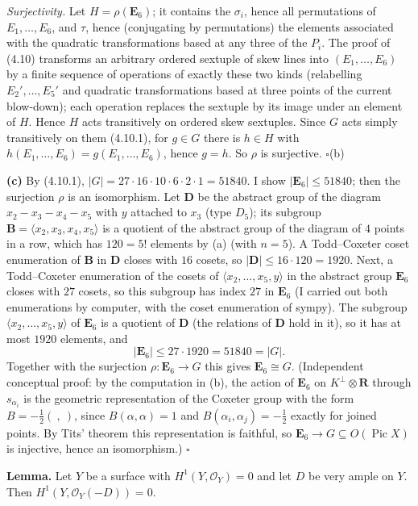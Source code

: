\documentclass[11pt]{article}
\begin{document}
\emph{Surjectivity.} Let $H=\rho(\mathbf E_6)$; it contains the $\sigma_i$, hence all permutations of $E_1,\dots,E_6$, and $\tau$, hence (conjugating by permutations) the elements associated with the quadratic transformations based at any three of the $P_i$. The proof of (4.10) transforms an arbitrary ordered sextuple of skew lines into $(E_1,\dots,E_6)$ by a finite sequence of operations of exactly these two kinds (relabelling $E_2',\dots,E_5'$ and quadratic transformations based at three points of the current blow-down); each operation replaces the sextuple by its image under an element of $H$. Hence $H$ acts transitively on ordered skew sextuples. Since $G$ acts simply transitively on them (4.10.1), for $g\in G$ there is $h\in H$ with $h(E_1,\dots,E_6)=g(E_1,\dots,E_6)$, hence $g=h$. So $\rho$ is surjective. \hfill$\square$(b)

\textbf{(c)} By (4.10.1), $|G|=27\cdot16\cdot10\cdot6\cdot2\cdot1=51840$. I show $|\mathbf E_6|\le51840$; then the surjection $\rho$ is an isomorphism. Let $\mathbf D$ be the abstract group of the diagram $x_2-x_3-x_4-x_5$ with $y$ attached to $x_3$ (type $D_5$); its subgroup $\mathbf B=\langle x_2,x_3,x_4,x_5\rangle$ is a quotient of the abstract group of the diagram of $4$ points in a row, which has $120=5!$ elements by (a) (with $n=5$). A Todd--Coxeter coset enumeration of $\mathbf B$ in $\mathbf D$ closes with $16$ cosets, so $|\mathbf D|\le16\cdot120=1920$. Next, a Todd--Coxeter enumeration of the cosets of $\langle x_2,\dots,x_5,y\rangle$ in the abstract group $\mathbf E_6$ closes with $27$ cosets, so this subgroup has index $27$ in $\mathbf E_6$ (I carried out both enumerations by computer, with the coset enumeration of sympy). The subgroup $\langle x_2,\dots,x_5,y\rangle$ of $\mathbf E_6$ is a quotient of $\mathbf D$ (the relations of $\mathbf D$ hold in it), so it has at most $1920$ elements, and
\[
|\mathbf E_6|\le27\cdot1920=51840=|G| .
\]
Together with the surjection $\rho:\mathbf E_6\to G$ this gives $\mathbf E_6\cong G$. (Independent conceptual proof: by the computation in (b), the action of $\mathbf E_6$ on $K^\perp\otimes\mathbf R$ through $s_{\alpha_i}$ is the geometric representation of the Coxeter group with the form $B=-\frac12(\ ,\ )$, since $B(\alpha,\alpha)=1$ and $B(\alpha_i,\alpha_j)=-\frac12$ exactly for joined points. By Tits' theorem this representation is faithful, so $\mathbf E_6\to G\subseteq O(\operatorname{Pic}X)$ is injective, hence an isomorphism.) \hfill$\square$

\pf
\textbf{Lemma.} Let $Y$ be a surface with $H^1(Y,\mathcal O_Y)=0$ and let $D$ be very ample on $Y$. Then $H^1(Y,\mathcal O_Y(-D))=0$.
\end{document}
